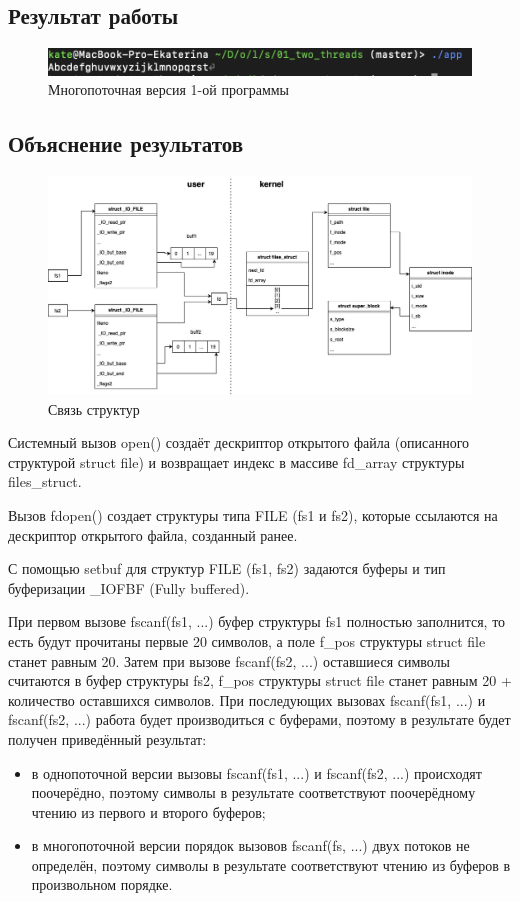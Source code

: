 \documentclass[12pt]{report}
\begin{document}
\subsection*{Результат работы}
\begin{figure}[H]
	\centering
	\includegraphics[scale=1]{res_01_two.png}
	\caption{Многопоточная версия 1-ой программы}
	\label{fig:1}
\end{figure}
\subsection*{Объяснение результатов}
\begin{figure}[H]
	\centering
	\includegraphics[scale=0.45]{os_lab_05-1.jpg}
	\caption{Связь структур}
	\label{fig:1}
\end{figure}
Системный вызов open() создаёт дескриптор открытого файла (описанного структурой struct file) и возвращает индекс в массиве fd\_array структуры files\_struct.

Вызов fdopen() создает структуры типа FILE (fs1 и fs2), которые ссылаются на дескриптор открытого файла, созданный ранее.

С помощью setbuf для структур FILE (fs1, fs2) задаются буферы и тип буферизации \_IOFBF (Fully buffered).

При первом вызове fscanf(fs1, ...) буфер структуры fs1 полностью заполнится, то есть будут прочитаны первые 20 символов, а поле f\_pos структуры struct file станет равным 20. Затем при вызове fscanf(fs2, ...) оставшиеся символы считаются в буфер структуры fs2, f\_pos структуры struct file станет равным 20 + количество оставшихся символов. При последующих вызовах fscanf(fs1, ...) и fscanf(fs2, ...) работа будет производиться с буферами, поэтому в результате будет получен приведённый результат:
\begin{itemize}
    \item в однопоточной версии вызовы fscanf(fs1, ...) и fscanf(fs2, ...) происходят поочерёдно, поэтому символы в результате соответствуют поочерёдному чтению из первого и второго буферов;
    \item в многопоточной версии порядок вызовов fscanf(fs, ...) двух потоков не определён, поэтому символы в результате соответствуют чтению из буферов в произвольном порядке.
\end{itemize}
\end{document}
